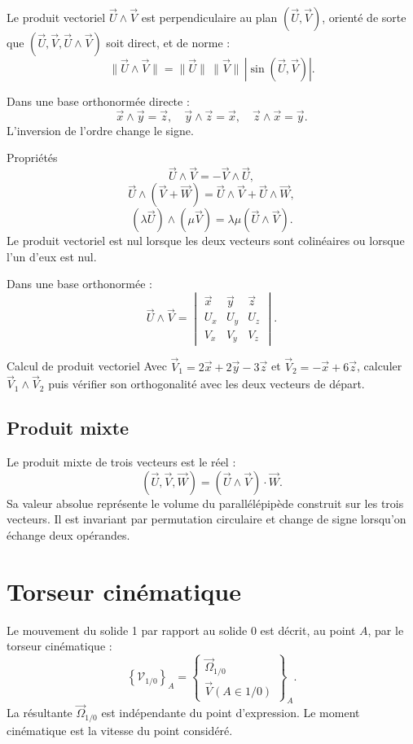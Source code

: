 Le produit vectoriel $\vec U\wedge\vec V$ est perpendiculaire au plan
$(\vec U,\vec V)$, orienté de sorte que
$(\vec U,\vec V,\vec U\wedge\vec V)$ soit direct, et de norme :
\[
\boxed{\|\vec U\wedge\vec V\|
=\|\vec U\|\,\|\vec V\|\,|\sin(\vec U,\vec V)|.}
\]

Dans une base orthonormée directe :
\[
\vec x\wedge\vec y=\vec z,
\quad
\vec y\wedge\vec z=\vec x,
\quad
\vec z\wedge\vec x=\vec y.
\]
L'inversion de l'ordre change le signe.

\begin{TLCineDef}{Propriétés}
\[
\vec U\wedge\vec V=-\vec V\wedge\vec U,
\]
\[
\vec U\wedge(\vec V+\vec W)
=\vec U\wedge\vec V+\vec U\wedge\vec W,
\]
\[
(\lambda\vec U)\wedge(\mu\vec V)
=\lambda\mu(\vec U\wedge\vec V).
\]
Le produit vectoriel est nul lorsque les deux vecteurs sont colinéaires
ou lorsque l'un d'eux est nul.
\end{TLCineDef}

Dans une base orthonormée :
\[
\vec U\wedge\vec V=
\begin{vmatrix}
\vec x&\vec y&\vec z\\
U_x&U_y&U_z\\
V_x&V_y&V_z
\end{vmatrix}.
\]

\begin{TLCineApp}{Calcul de produit vectoriel}
Avec
$\vec V_1=2\vec x+2\vec y-3\vec z$ et
$\vec V_2=-\vec x+6\vec z$, calculer
$\vec V_1\wedge\vec V_2$ puis vérifier son orthogonalité avec les deux
vecteurs de départ.
\end{TLCineApp}

\subsection{Produit mixte}

Le produit mixte de trois vecteurs est le réel :
\[
(\vec U,\vec V,\vec W)
=(\vec U\wedge\vec V)\cdot\vec W.
\]
Sa valeur absolue représente le volume du parallélépipède construit sur
les trois vecteurs. Il est invariant par permutation circulaire et
change de signe lorsqu'on échange deux opérandes.

\section{Torseur cinématique}
\label{sec:cine-torseur}

Le mouvement du solide 1 par rapport au solide 0 est décrit, au point
$A$, par le torseur cinématique :
\[
\boxed{
\left\{\mathcal V_{1/0}\right\}_A
=\left\{\begin{array}{c}
\vec\Omega_{1/0}\\
\vec V(A\in1/0)
\end{array}\right\}_A.}
\]
La résultante $\vec\Omega_{1/0}$ est indépendante du point d'expression.
Le moment cinématique est la vitesse du point considéré.

